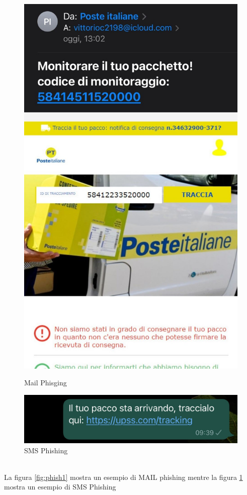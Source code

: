 \begin{figure}
  \centering
  \begin{minipage}[b]{0.4\textwidth}
    \includegraphics[width=\textwidth]{pictures/phishing1.jpeg}
    \caption{Mail Phisging}
    \label{fig:phish1}
  \end{minipage}
  \hfill
  \begin{minipage}[b]{0.4\textwidth}
    \includegraphics[width=\textwidth]{pictures/phishing2.jpeg}
    \caption{SMS Phishing}
    \label{fig:phish2}
  \end{minipage}
\end{figure}\\
La figura \ref{fig:phish1} mostra un esempio di MAIL phishing mentre la figura \ref{fig:phish2} mostra un esempio di SMS Phishing\\



